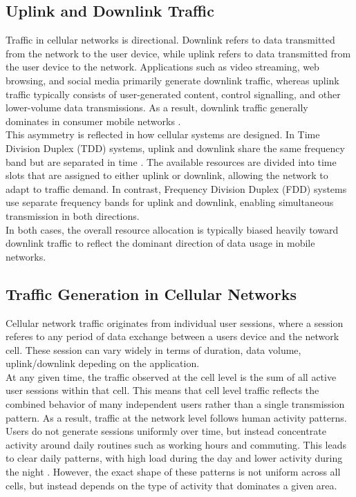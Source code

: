 \subsection{Uplink and Downlink Traffic}

Traffic in cellular networks is directional. Downlink refers to data transmitted from the network to the user device, while uplink refers to data transmitted from the user device to the network. Applications such as video streaming, web browsing, and social media primarily generate downlink traffic, whereas uplink traffic typically consists of user-generated content, control signalling, and other lower-volume data transmissions. As a result, downlink traffic generally dominates in consumer mobile networks \cite{ericsson5gnr}. \\

This asymmetry is reflected in how cellular systems are designed. In Time Division Duplex (TDD) systems, uplink and downlink share the same frequency band but are separated in time \cite{ericsson5gnr}. The available resources are divided into time slots that are assigned to either uplink or downlink, allowing the network to adapt to traffic demand. In contrast, Frequency Division Duplex (FDD) systems use separate frequency bands for uplink and downlink, enabling simultaneous transmission in both directions. \\

In both cases, the overall resource allocation is typically biased heavily toward downlink traffic to reflect the dominant direction of data usage in mobile networks. \\

\subsection{Traffic Generation in Cellular Networks}
Cellular network traffic originates from individual user sessions, where a session referes to any period of data exchange between a users device and the network cell. These session can vary widely in terms of duration, data volume, uplink/downlink depeding on the application.\\

 At any given time, the traffic observed at the cell level is the sum of all active user sessions within that cell. This means that cell level traffic reflects the combined behavior of many independent users rather than a single transmission pattern. As a result, traffic at the network level follows human activity patterns. Users do not generate sessions uniformly over time, but instead concentrate activity around daily routines such as working hours and commuting. This leads to clear daily patterns, with high load during the day and lower activity during the night \cite{diverse_traffic_patterns}. However, the exact shape of these patterns is not uniform across all cells, but instead depends on the type of activity that dominates a given area. \\

